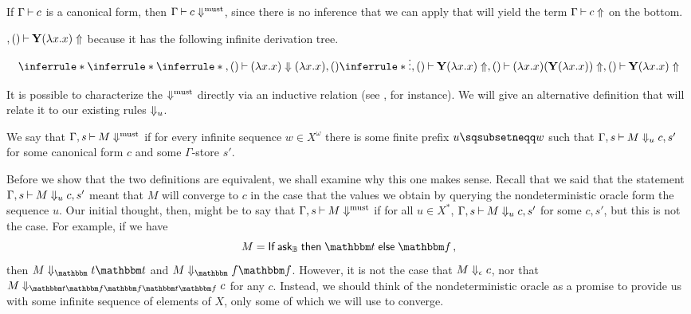 \documentclass{article}
\begin{document}
\begin{example}
  If $\Gamma\mathbin{\vdash} c$ is a canonical form, then $\Gamma\mathbin{\vdash} c\Downarrow^{\text{must}}$, since there is no inference that we can apply that will yield the term $\Gamma\mathbin{\vdash} c\Uparrow$ on the bottom.
\end{example}

\begin{example}
  $,()\mathbin{\vdash} \mathbf{Y}(\lambda x.x)\Uparrow$ because it has the following infinite derivation tree.
  \[
    \inferrule*
    {
      \inferrule*
      {
        \inferrule*
        {
        }
        {
          ,()\ts (\lambda x.x) \converges (\lambda x.x),()
        }
        \\
        \inferrule*
        {
          \vdots
        }
        {
          ,() \ts \Y(\lambda x.x)\diverges
        }
      }
      {
        ,()\ts (\lambda x.x)(\Y(\lambda x.x)) \diverges
      }
    }
    {
      ,()\ts \Y(\lambda x.x)\diverges
    }
    \]
\end{example}

It is possible to characterize the $\Downarrow^{\text{must}}$ directly via an inductive relation (see \cite{RusssThesis}, for instance).  
We will give an alternative definition that will relate it to our existing rules $\Downarrow_u$.

\begin{definition}
  We say that $\Gamma,s\mathbin{\vdash} M\Downarrow^{\text{must}}$ if for every infinite sequence $w\in X^\omega$ there is some finite prefix $u\pprefix w$ such that $\Gamma,s\mathbin{\vdash} M\Downarrow_u c,s'$ for some canonical form $c$ and some $\Gamma$-store $s'$.
  \label{DefMustConvergence}
\end{definition}

Before we show that the two definitions are equivalent, we shall examine why this one makes sense.  
Recall that we said that the statement $\Gamma,s\mathbin{\vdash} M\Downarrow_u c,s'$ meant that $M$ will converge to $c$ in the case that the values we obtain by querying the nondeterministic oracle form the sequence $u$.  
Our initial thought, then, might be to say that $\Gamma,s\mathbin{\vdash} M\Downarrow^{\text{must}}$ if for all $u\in X^*$, $\Gamma,s\mathbin{\vdash} M\Downarrow_u c,s'$ for some $c,s'$, but this is not the case.  
For example, if we have
\[
  M = \If \ask_\bB \Then \true \Else \false\,,
  \]
then $M\converges_\true \true$ and $M\converges_\false \false$.  
However, it is not the case that $M\Downarrow_\epsilon c$, nor that $M\converges_{\true\false\false\true\false}c$ for any $c$.
Instead, we should think of the nondeterministic oracle as a promise to provide us with some infinite sequence of elements of $X$, only some of which we will use to converge.
\end{document}
